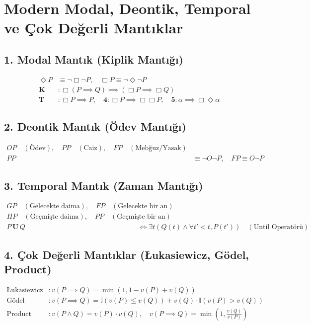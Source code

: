 \documentclass[11pt, a4paper]{article}
\begin{document}
\section{Modern Modal, Deontik, Temporal ve Çok Değerli Mantıklar}

\subsection{1. Modal Mantık (Kiplik Mantığı)}

\begin{align}
\Diamond P &\equiv \neg \Box \neg P, \quad \Box P \equiv \neg \Diamond \neg P \\
\mathbf{K} &: \Box(P \implies Q) \implies (\Box P \implies \Box Q) \\
\mathbf{T} &: \Box P \implies P, \quad \mathbf{4} : \Box P \implies \Box \Box P, \quad \mathbf{5} : \alpha \implies \Box \Diamond \alpha
\end{align}

\subsection{2. Deontik Mantık (Ödev Mantığı)}

\begin{align}
O P \quad (\text{Ödev}), \quad P P \quad (\text{Caiz}), \quad F P \quad (\text{Mebğuz/Yasak}) \\
P P &\equiv \neg O \neg P, \quad F P \equiv O \neg P
\end{align}

\subsection{3. Temporal Mantık (Zaman Mantığı)}

\begin{align}
G P \quad (\text{Gelecekte daima}), \quad F P \quad (\text{Gelecekte bir an}) \\
H P \quad (\text{Geçmişte daima}), \quad P P \quad (\text{Geçmişte bir an}) \\
P \, \mathbf{U} \, Q &\iff \exists t (Q(t) \land \forall t' < t, P(t')) \quad (\text{Until Operatörü})
\end{align}

\subsection{4. Çok Değerli Mantıklar (Łukasiewicz, Gödel, Product)}

\begin{align}
\text{Łukasiewicz} &: v(P \implies Q) = \min(1, 1 - v(P) + v(Q)) \\
\text{Gödel} &: v(P \implies Q) = \mathbb{I}(v(P) \le v(Q)) + v(Q) \cdot \mathbb{I}(v(P) > v(Q)) \\
\text{Product} &: v(P \land Q) = v(P) \cdot v(Q), \quad v(P \implies Q) = \min\left(1, \frac{v(Q)}{v(P)}\right)
\end{align}
\end{document}
